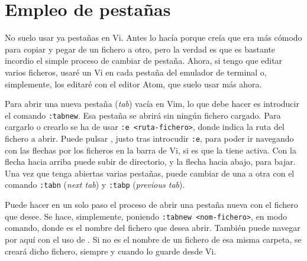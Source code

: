 \section{Empleo de pestañas}\label{sec:vim-pestanas}
No suelo usar ya pestañas en Vi. Antes lo hacía porque creía que era más cómodo para copiar y pegar de un
fichero a otro, pero la verdad es que es bastante incordio el simple proceso de cambiar de pestaña. Ahora, si
tengo que editar varios ficheros, usaré un Vi en cada pestaña del emulador de terminal o, simplemente, los
editaré con el editor Atom, que suelo usar más ahora.

Para abrir una nueva pestaña (\foreignlanguage{english}{\emph{tab}}) vacía en Vim, lo que debe hacer es
introducir el comando \lstinline!:tabnew!. Esa pestaña se abrirá sin ningún fichero cargado. Para cargarlo o
crearlo se ha de usar \lstinline!:e <ruta-fichero>!, donde  indica la ruta del fichero a
abrir. Puede pulsar , justo tras introcudir \lstinline!:e!, para poder ir navegando con las flechas
por los ficheros en la barra de Vi, si es que la tiene activa. Con la flecha hacia arriba puede subir de
directorio, y la flecha hacia abajo, para bajar. Una vez que tenga abiertas varias pestañas, puede cambiar de
una a otra con el comando \lstinline+:tabn+ (\foreignlanguage{english}{\emph{next tab}}) y \lstinline+:tabp+
(\foreignlanguage{english}{\emph{previous tab}}).

Puede hacer en un solo paso el proceso de abrir una pestaña nueva con el fichero que desee. Se hace,
simplemente, poniendo \lstinline!:tabnew <nom-fichero>!, en modo comando, donde  es el nombre
del fichero que desea abrir. También puede navegar por aquí con el uso de . Si  no
es el nombre de un fichero de esa misma carpeta, se creará dicho fichero, siempre y cuando lo guarde desde Vi.
